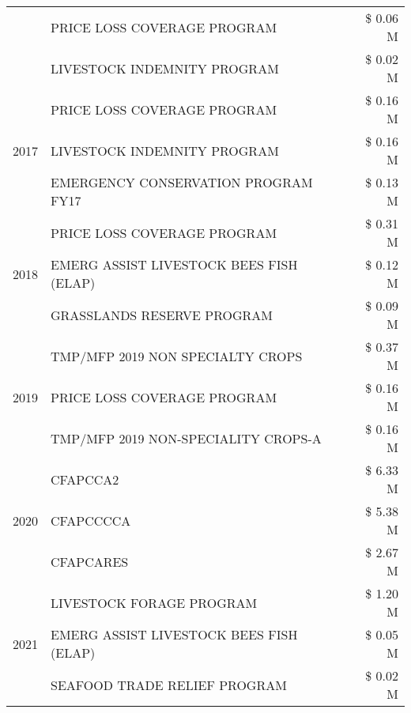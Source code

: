 \begin{tabular}{llr}
 & PRICE LOSS COVERAGE PROGRAM & \$ 0.06 M \\
 & LIVESTOCK INDEMNITY PROGRAM & \$ 0.02 M \\
\cline{1-3}
\multirow[t]{3}{*}{2017} & PRICE LOSS COVERAGE PROGRAM & \$ 0.16 M \\
 & LIVESTOCK INDEMNITY PROGRAM & \$ 0.16 M \\
 & EMERGENCY CONSERVATION PROGRAM FY17 & \$ 0.13 M \\
\cline{1-3}
\multirow[t]{3}{*}{2018} & PRICE LOSS COVERAGE PROGRAM & \$ 0.31 M \\
 & EMERG ASSIST LIVESTOCK BEES FISH (ELAP) & \$ 0.12 M \\
 & GRASSLANDS RESERVE PROGRAM & \$ 0.09 M \\
\cline{1-3}
\multirow[t]{3}{*}{2019} & TMP/MFP 2019 NON SPECIALTY CROPS & \$ 0.37 M \\
 & PRICE LOSS COVERAGE PROGRAM & \$ 0.16 M \\
 & TMP/MFP 2019 NON-SPECIALITY CROPS-A & \$ 0.16 M \\
\cline{1-3}
\multirow[t]{3}{*}{2020} & CFAPCCA2 & \$ 6.33 M \\
 & CFAPCCCCA & \$ 5.38 M \\
 & CFAPCARES & \$ 2.67 M \\
\cline{1-3}
\multirow[t]{3}{*}{2021} & LIVESTOCK FORAGE PROGRAM & \$ 1.20 M \\
 & EMERG ASSIST LIVESTOCK BEES FISH (ELAP) & \$ 0.05 M \\
 & SEAFOOD TRADE RELIEF PROGRAM & \$ 0.02 M \\
\cline{1-3}
\bottomrule
\end{tabular}
